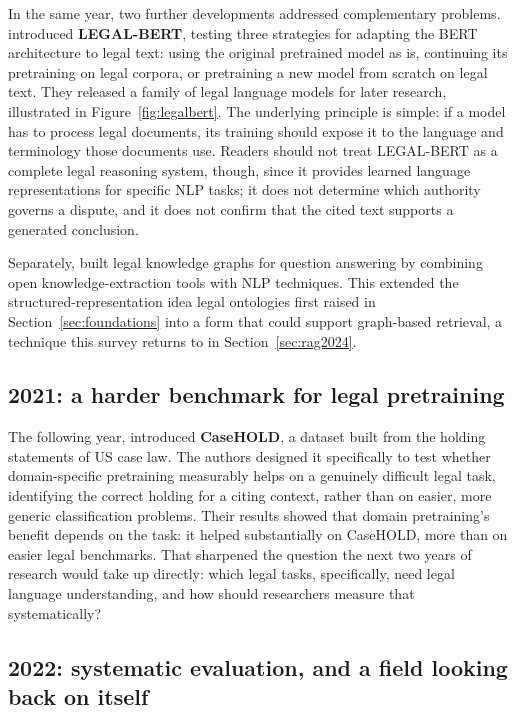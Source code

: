 In the same year, two further developments addressed complementary problems. \citet{chalkidis2020}
introduced \textbf{LEGAL-BERT}, testing three strategies for adapting the BERT architecture to legal
text: using the original pretrained model as is, continuing its pretraining on legal corpora, or
pretraining a new model from scratch on legal text. They released a family of legal language models
for later research, illustrated in Figure~\ref{fig:legalbert}. The underlying principle is simple:
if a model has to process legal documents, its training should expose it to the language and
terminology those documents use. Readers should not treat LEGAL-BERT as a complete legal reasoning
system, though, since it provides learned language representations for specific NLP tasks; it does
not determine which authority governs a dispute, and it does not confirm that the cited text
supports a generated conclusion.



Separately, \citet{sovrano2020} built legal knowledge graphs for question answering by combining
open knowledge-extraction tools with NLP techniques. This extended the structured-representation
idea legal ontologies first raised in Section~\ref{sec:foundations} into a form that could support
graph-based retrieval, a technique this survey returns to in Section~\ref{sec:rag2024}.

\subsection{2021: a harder benchmark for legal pretraining}

The following year, \citet{zheng2021} introduced \textbf{CaseHOLD}, a dataset built from the holding
statements of US case law. The authors designed it specifically to test whether domain-specific
pretraining measurably helps on a genuinely difficult legal task, identifying the correct holding
for a citing context, rather than on easier, more generic classification problems. Their results
showed that domain pretraining's benefit depends on the task: it helped substantially on CaseHOLD,
more than on easier legal benchmarks. That sharpened the question the next two years of research
would take up directly: which legal tasks, specifically, need legal language understanding, and how
should researchers measure that systematically?

\subsection{2022: systematic evaluation, and a field looking back on itself}

